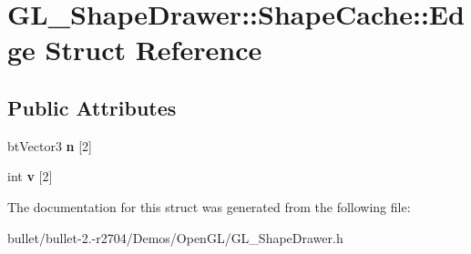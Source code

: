 \hypertarget{struct_g_l___shape_drawer_1_1_shape_cache_1_1_edge}{\section{G\+L\+\_\+\+Shape\+Drawer\+:\+:Shape\+Cache\+:\+:Edge Struct Reference}
\label{struct_g_l___shape_drawer_1_1_shape_cache_1_1_edge}
}
\subsection*{Public Attributes}
\begin{DoxyCompactItemize}
\item 
\hypertarget{struct_g_l___shape_drawer_1_1_shape_cache_1_1_edge_acd6f31d44940d6c7f4076de5a51e14ea}{bt\+Vector3 {\bfseries n} \mbox{[}2\mbox{]}}\label{struct_g_l___shape_drawer_1_1_shape_cache_1_1_edge_acd6f31d44940d6c7f4076de5a51e14ea}

\item 
\hypertarget{struct_g_l___shape_drawer_1_1_shape_cache_1_1_edge_a1ef306d1d8e68e057dab7d35378ce68a}{int {\bfseries v} \mbox{[}2\mbox{]}}\label{struct_g_l___shape_drawer_1_1_shape_cache_1_1_edge_a1ef306d1d8e68e057dab7d35378ce68a}

\end{DoxyCompactItemize}


The documentation for this struct was generated from the following file\+:\begin{DoxyCompactItemize}
\item 
bullet/bullet-\/2.-\/r2704/\+Demos/\+Open\+G\+L/G\+L\+\_\+\+Shape\+Drawer.\+h\end{DoxyCompactItemize}
